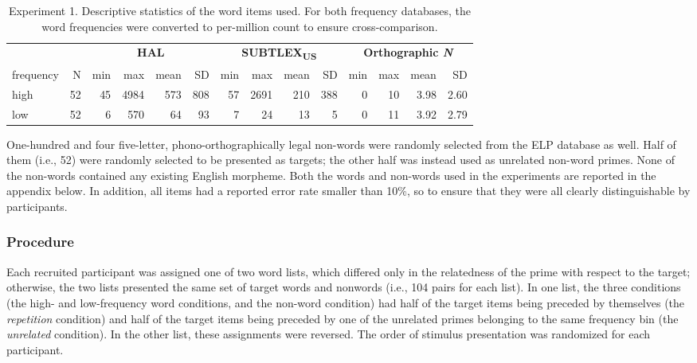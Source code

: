 \documentclass[
]{interact}
\begin{document}
\begin{longtable}{lrrrrrrrrrrrrr}

\caption{\label{tbl-words_exp1}Experiment 1. Descriptive statistics of
the word items used. For both frequency databases, the word frequencies
were converted to per-million count to ensure cross-comparison.}

\tabularnewline

\toprule
 &  & \multicolumn{4}{c}{\textbf{HAL}} & \multicolumn{4}{c}{\textbf{SUBTLEX\textsubscript{US}}} & \multicolumn{4}{c}{\textbf{Orthographic \emph{N}}} \\ 
\cmidrule(lr){3-6} \cmidrule(lr){7-10} \cmidrule(lr){11-14}
frequency & N & min & max & mean & SD & min & max & mean & SD & min & max & mean & SD \\ 
\midrule\addlinespace[2.5pt]
high & 52 & 45 & 4984 & 573 & 808 & 57 & 2691 & 210 & 388 & 0 & 10 & 3.98 & 2.60 \\ 
low & 52 & 6 & 570 & 64 & 93 & 7 & 24 & 13 & 5 & 0 & 11 & 3.92 & 2.79 \\ 
\bottomrule

\end{longtable}

One-hundred and four five-letter, phono-orthographically legal non-words
were randomly selected from the ELP database as well. Half of them
(i.e., 52) were randomly selected to be presented as targets; the other
half was instead used as unrelated non-word primes. None of the
non-words contained any existing English morpheme. Both the words and
non-words used in the experiments are reported in the appendix below. In
addition, all items had a reported error rate smaller than 10\%, so to
ensure that they were all clearly distinguishable by participants.

\subsubsection{Procedure}\label{sec-exp1-methods-proc}

Each recruited participant was assigned one of two word lists, which
differed only in the relatedness of the prime with respect to the
target; otherwise, the two lists presented the same set of target words
and nonwords (i.e., 104 pairs for each list). In one list, the three
conditions (the high- and low-frequency word conditions, and the
non-word condition) had half of the target items being preceded by
themselves (the \emph{repetition} condition) and half of the target
items being preceded by one of the unrelated primes belonging to the
same frequency bin (the \emph{unrelated} condition). In the other list,
these assignments were reversed. The order of stimulus presentation was
randomized for each participant.
\end{document}
